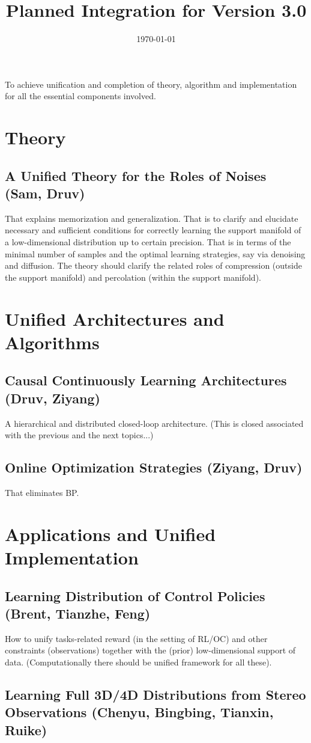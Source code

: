 \documentclass{article}
\title{Planned Integration for \textbf{Version 3.0}}
\date{\today}
\begin{document}
\maketitle
To achieve unification and completion of theory, algorithm and implementation for all the essential components involved. 

\section{Theory}
\subsection{A Unified Theory for the Roles of Noises (Sam, Druv)}
That explains memorization and generalization. That is to clarify and elucidate necessary and sufficient conditions for correctly learning the support manifold of a low-dimensional distribution up to certain precision. That is in terms of the minimal number of samples and the optimal learning strategies,  say via denoising and diffusion. The theory should clarify the related roles of compression (outside the support manifold) and percolation (within the support manifold). 


\section{Unified Architectures and Algorithms }
\subsection{Causal Continuously Learning Architectures (Druv, Ziyang)}
A hierarchical and distributed closed-loop architecture. (This is closed associated with the previous and the next topics...)

\subsection{Online Optimization Strategies (Ziyang, Druv)}
That eliminates BP. 

\section{Applications and Unified Implementation }
\subsection{Learning Distribution of Control Policies (Brent, Tianzhe, Feng)} 
How to unify tasks-related reward (in the setting of RL/OC) and other constraints (observations) together with the (prior) low-dimensional support of data. (Computationally there should be unified framework for all these).
\subsection{Learning Full 3D/4D Distributions from Stereo Observations (Chenyu, Bingbing, Tianxin, Ruike)}
\end{document}
